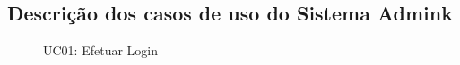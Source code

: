 \renewcommand{\figurename}{Quadro}
\setcounter{figure}{0}
\begin{apendicesenv}
\partapendices

\chapter{Descrição dos casos de uso do Sistema Admink}
\label{chap:apendiceA}

    \begin{figure}[!htb]
	    \centering
	    \begin{minipage}{\wd0}
		    \caption[]{UC01: Efetuar Login}
		    \label{fig:uc1-admink}
	    \end{minipage}
    \end{figure}
    


\end{apendicesenv}

